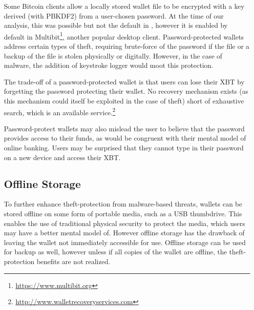 Some Bitcoin clients allow a locally stored wallet file to be encrypted with a key derived (\eg with PBKDF2) from a user-chosen password. At the time of our analysis, this was possible but not the default in \bitcoinclient, however it is enabled by default in Multibit\footnote{\url{https://www.multibit.org}}, another popular desktop client. Password-protected wallets address certain types of theft, requiring brute-force of the password if the file or a backup of the file is stolen physically or digitally. However, in the case of malware, the addition of keystroke logger would moot this protection.

The trade-off of a password-protected wallet is that users can lose their XBT by forgetting the password protecting their wallet. No recovery mechanism exists (as this mechanism could itself be exploited in the case of theft) short of exhaustive search, which is an available service.\footnote{\url{http://www.walletrecoveryservices.com}}

Password-protect wallets may also mislead the user to believe that the password provides access to their funds, as would be congruent with their mental model of online banking. Users may be surprised that they cannot type in their password on a new device and access their XBT. 

\subsection{Offline Storage}
\label{sec:offline storage}

To further enhance theft-protection from malware-based threats, wallets can be stored offline on some form of portable media, such as a USB thumbdrive. This enables the use of traditional physical security to protect the media, which users may have a better mental model of. However offline storage has the drawback of leaving the wallet not immediately accessible for use. Offline storage can be used for backup as well, however unless if all copies of the wallet are offline, the theft-protection benefits are not realized. 

